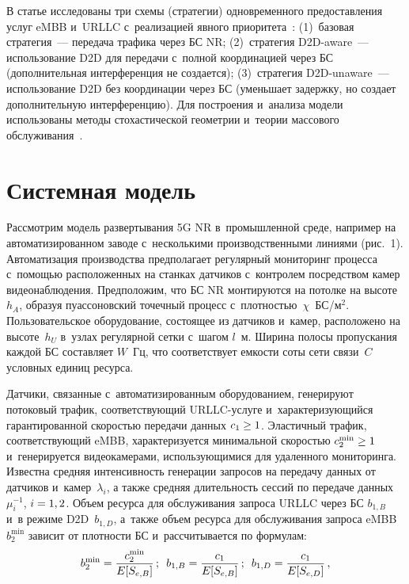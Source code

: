 \begin{multicols}{2}
В статье исследованы три схемы (стратегии) одновременного предоставления услуг 
eMBB и~URLLC с~реализацией явного приоритета~\cite{kochetkova2021queuing}: 
(1)~базовая стратегия~--- передача трафика через БС NR; (2)~стратегия 
D2D-aware~--- использование D2D для передачи с~полной 
координацией через БС (дополнительная интерференция не создается); (3)~стратегия 
D2D-unaware~--- использование D2D без координации через БС (уменьшает задержку, 
но создает дополнительную интерференцию). Для построения и~анализа модели 
использованы методы стохастической геометрии и~теории массового обслуживания~\cite{gorbunova2018resource}.

\vspace*{-6pt}

\section{Системная модель}

\vspace*{-3pt}

Рассмотрим модель развертывания 5G NR в~промышленной среде, например на 
автоматизированном заводе с~несколькими производственными линиями (рис.~1). 
Автоматизация производства предполагает регулярный мониторинг процесса с~по\-мощью 
расположенных на станках датчиков с~контролем посредством камер видеонаблюдения. 
Предположим, что БС NR монтируются на потолке на высоте~$h_A$, образуя 
пуассоновский точечный процесс с~плотностью~$\chi$~БС/$\text{м}^2$. Пользовательское оборудование, состоящее из датчиков и~камер, 
расположено на высоте~$h_U$ в~узлах регулярной сетки с~шагом $l$~м. Ширина 
полосы пропускания каждой БС составляет $W$~Гц, что соответствует емкости соты 
сети связи~$C$ условных единиц ре\-сурса.
{

}



Датчики, связанные с~автоматизированным оборудованием, генерируют потоковый 
трафик, соответствующий  URLLC-услуге и~ха\-рак\-те\-ри\-зу\-ющий\-ся гарантированной 
скоростью передачи данных $c_1 \hm\geq 1$. Эластичный трафик, соответствующий eMBB, 
характеризуется минимальной скоростью $c_2^{\min} \hm\geq 1$ и~генерируется 
видеокамерами, использующимися для удаленного мониторинга. Известна средняя 
интенсивность генерации запросов на передачу данных от датчиков и~камер~$\lambda_i$, а также средняя длительность сессий по передаче данных~$\mu_i^{-1}$, 
$i \hm= 1,2$.
Объем ресурса для обслуживания запроса URLLC через БС $b_{1,B}$ и~в режиме D2D~$b_{1,D}$, а~также объем ресурса для обслуживания запроса \mbox{eMBB}~$b_2^{\min}$ 
зависит от плотности БС и~рассчитывается по формулам:
\begin{equation*}
b_2^{\min}=\displaystyle\frac{\displaystyle c_2^{\min}\mathstrut}{\displaystyle E[S_{e,B}]\mathstrut}\,;\enskip b_{1,B} =\displaystyle\frac{\displaystyle c_1\mathstrut}{\displaystyle E[S_{e,B}]\mathstrut}\,;\enskip
  b_{1,D}=\displaystyle\frac{\displaystyle c_1\mathstrut}{\displaystyle E[S_{e,D}]\mathstrut}\,,
\end{equation*}


\end{multicols}
